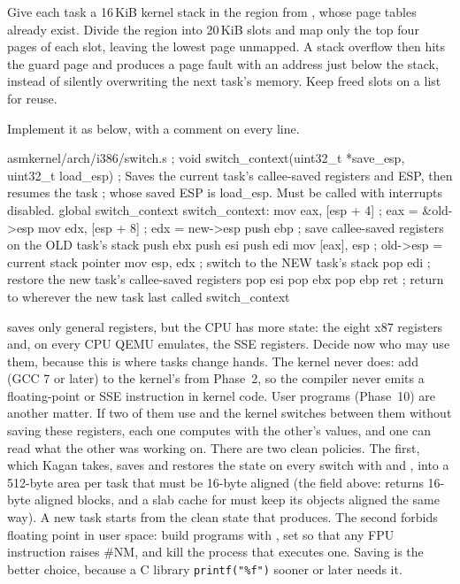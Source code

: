 \documentclass[11pt,a4paper]{article}
\begin{document}
Give each task a 16\,KiB kernel stack in the region from , whose page tables already exist. Divide
the region into 20\,KiB slots and map only the top four pages of each slot, leaving the lowest page unmapped. A stack
overflow then hits the guard page and produces a page fault with an address just below the stack, instead of silently
overwriting the next task's memory. Keep freed slots on a list for reuse.

Implement it as below, with a comment on every line.

\begin{lst}{asm}{kernel/arch/i386/switch.s}
; void switch_context(uint32_t *save_esp, uint32_t load_esp)
; Saves the current task's callee-saved registers and ESP, then resumes the task
; whose saved ESP is load_esp. Must be called with interrupts disabled.
global switch_context
switch_context:
    mov  eax, [esp + 4]     ; eax = &old->esp
    mov  edx, [esp + 8]     ; edx = new->esp
    push ebp                ; save callee-saved registers on the OLD task's stack
    push ebx
    push esi
    push edi
    mov  [eax], esp         ; old->esp = current stack pointer
    mov  esp, edx           ; switch to the NEW task's stack
    pop  edi                ; restore the new task's callee-saved registers
    pop  esi
    pop  ebx
    pop  ebp
    ret                     ; return to wherever the new task last called switch_context
\end{lst}

 saves only general registers, but the CPU has more state: the eight x87 registers and, on
every CPU QEMU emulates, the SSE registers. Decide now who may use them, because this is where tasks change hands.
The kernel never does: add  (GCC 7 or later) to the kernel's  from Phase~2, so
the compiler never emits a floating-point or SSE instruction in kernel code. User programs (Phase~10) are another
matter. If two of them use  and the kernel switches between them without saving these registers, each
one computes with the other's values, and one can read what the other was working on. There are two clean policies.
The first, which Kagan takes, saves and restores the state on every switch with  and ,
into a 512-byte area per task that must be 16-byte aligned (the  field above:  returns
16-byte aligned blocks, and a slab cache for  must keep its objects aligned the same way). A new task
starts from the clean state that  produces. The second forbids floating point in user space: build
programs with , set  so that any FPU instruction raises \#NM, and kill the process
that executes one. Saving is the better choice, because a C library \texttt{printf("\%f")} sooner or later needs it.
\end{document}
